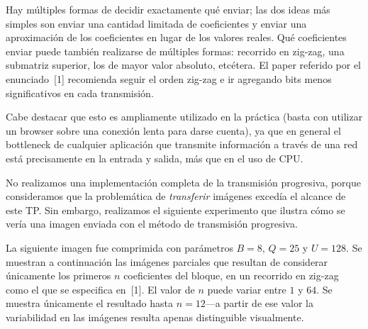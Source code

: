 \documentclass{article}
\begin{document}
Hay múltiples formas de decidir exactamente qué enviar; las dos ideas más simples son enviar una cantidad limitada de coeficientes y enviar una aproximación de los coeficientes en lugar de los valores reales. Qué coeficientes enviar puede también realizarse de múltiples formas: recorrido en zig-zag, una submatriz superior, los de mayor valor absoluto, etcétera. El paper referido por el enunciado~[1] recomienda seguir el orden zig-zag e ir agregando bits menos significativos en cada transmisión.

Cabe destacar que esto es ampliamente utilizado en la práctica (basta con utilizar un browser sobre una conexión lenta para darse cuenta), ya que en general el bottleneck de cualquier aplicación que transmite información a través de una red está precisamente en la entrada y salida, más que en el uso de CPU.

No realizamos una implementación completa de la transmisión progresiva, porque consideramos que la problemática de {\em transferir} imágenes excedía el alcance de este TP. Sin embargo, realizamos el siguiente experimento que ilustra cómo se vería una imagen enviada con el método de transmisión progresiva.

La siguiente imagen fue comprimida con parámetros $B = 8$, $Q = 25$ y $U = 128$.
Se muestran a continuación las imágenes parciales que resultan de considerar
únicamente los primeros $n$ coeficientes del bloque, en un recorrido en zig-zag
como el que se especifica en~[1]. El valor de $n$ puede variar entre $1$ y $64$.
Se muestra únicamente el resultado hasta $n = 12$---a partir de ese valor la
variabilidad en las imágenes resulta apenas distinguible visualmente.
\bigskip
\end{document}
